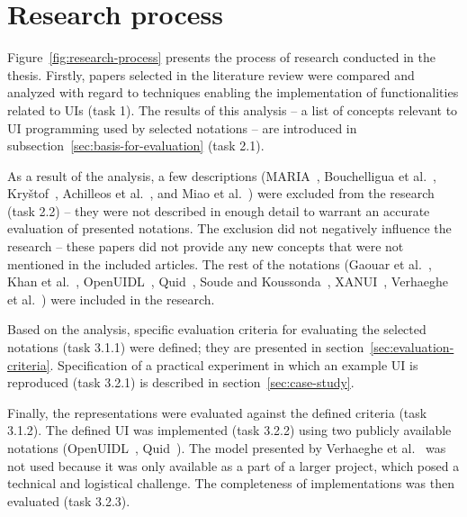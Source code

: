 \section{Research process}\label{sec:research-process}

Figure~\ref{fig:research-process} presents the process of research conducted in the thesis.
Firstly, papers selected in the literature review were compared and analyzed with regard to techniques enabling the implementation of functionalities related to UIs (task 1).
The results of this analysis -- a list of concepts relevant to UI programming used by selected notations -- are introduced in subsection~\ref{sec:basis-for-evaluation} (task 2.1).

As a result of the analysis, a few descriptions (MARIA~\cite{Paterno2009, MariaPDF}, Bouchelligua et al.~\cite{Bouchelligua2010}, Kryštof~\cite{kryvstof2010lpgm}, Achilleos et al.~\cite{Achilleos2011}, and Miao et al.~\cite{Miao2017}) were excluded from the research (task 2.2) -- they were not described in enough detail to warrant an accurate evaluation of presented notations.
The exclusion did not negatively influence the research -- these papers did not provide any new concepts that were not mentioned in the included articles.
The rest of the notations (Gaouar et al.~\cite{Gaouar2018}, Khan et al.~\cite{Khan2021}, OpenUIDL~\cite{Moldovan2020}, Quid~\cite{molina2018quid, Molina2019}, Soude and Koussonda~\cite{Soude2022}, XANUI~\cite{hermida2016xanui}, Verhaeghe et al.~\cite{Verhaeghe2021visual, Verhaeghe2021behavior}) were included in the research.

Based on the analysis, specific evaluation criteria for evaluating the selected notations (task 3.1.1) were defined; they are presented in section~\ref{sec:evaluation-criteria}.
Specification of a practical experiment in which an example UI is reproduced (task 3.2.1) is described in section~\ref{sec:case-study}.

Finally, the representations were evaluated against the defined criteria (task 3.1.2).
The defined UI was implemented (task 3.2.2) using two publicly available notations (OpenUIDL~\cite{Moldovan2020}, Quid~\cite{molina2018quid, Molina2019}).
The model presented by Verhaeghe et al.~\cite{Verhaeghe2021visual, Verhaeghe2021behavior} was not used because it was only available as a part of a larger project, which posed a technical and logistical challenge.
The completeness of implementations was then evaluated (task 3.2.3).

